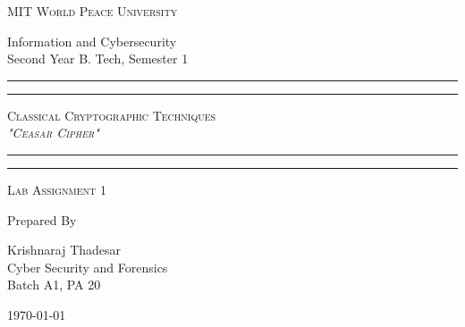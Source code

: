 \documentclass[11pt]{article}
\begin{document}
\begin{titlepage}
	\centering


	\huge\textsc{
		MIT World Peace University
	}\\

	\vspace{0.75\baselineskip} %

	\LARGE{
		Information and Cybersecurity\\
		Second Year B. Tech, Semester 1
	}

	\vfill %


	\rule{\textwidth}{1.6pt}\vspace*{-\baselineskip}\vspace*{2pt}
	\rule{\textwidth}{0.6pt}
	\vspace{0.75\baselineskip} %



	\huge{\textsc{
			Classical Cryptographic Techniques\\
			\textit{"Ceasar Cipher"}
		}} \\



	\vspace{0.5\baselineskip} %
	\rule{\textwidth}{0.6pt}\vspace*{-\baselineskip}\vspace*{2.8pt}
	\rule{\textwidth}{1.6pt}

	\vspace{1\baselineskip} %


	\LARGE\textsc{
		Lab Assignment 1
	} %
	\vfill


	Prepared By
	\vspace{0.5\baselineskip} %

	\Large{
		Krishnaraj Thadesar \\
		Cyber Security and Forensics\\
		Batch A1, PA 20
	}


	\vspace{0.5\baselineskip} %
	\today

\end{titlepage}
\end{document}
